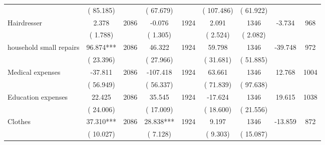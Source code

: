 \begin{tabular}{l*{8}{c}}
                       &       (      85.185)            &                               &       (      67.679)            &                               &       (     107.486)            &       (      61.922) &                  \\
Hairdresser        &              2.378      &       2086       &             -0.076      &       1924       &              2.091      &       1346  &       -3.734 &       968       \\
                       &       (       1.788)            &                               &       (       1.305)            &                               &       (       2.524)            &       (       2.082) &                  \\
household small repairs        &             96.874***      &       2086       &             46.322      &       1924       &             59.798      &       1346  &      -39.748 &       972       \\
                       &       (      23.396)            &                               &       (      27.966)            &                               &       (      31.681)            &       (      51.885) &                  \\
Medical expenses        &            -37.811      &       2086       &           -107.418      &       1924       &             63.661      &       1346  &       12.768 &       1004       \\
                       &       (      56.949)            &                               &       (      56.337)            &                               &       (      71.839)            &       (      97.638) &                  \\
Education expenses        &             22.425      &       2086       &             35.545      &       1924       &            -17.624      &       1346  &       19.615 &       1038       \\
                       &       (      24.006)            &                               &       (      17.009)            &                               &       (      18.600)            &       (      21.556) &                  \\
Clothes        &             37.310***      &       2086       &             28.838***      &       1924       &              9.197      &       1346  &      -13.859 &       872       \\
                       &       (      10.027)            &                               &       (       7.128)            &                               &       (       9.303)            &       (      15.087) &                  \\

\end{tabular}
